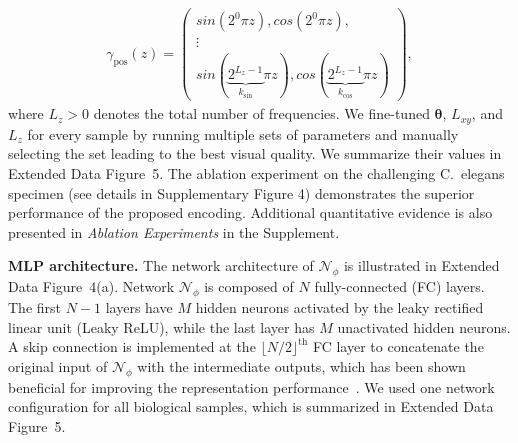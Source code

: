\documentclass[11pt]{article}
\theoremstyle{plain} %
\def\Ncal{{\mathcal{N}}}
\def\sin{{\textit{sin}}}
\def\cos{{\textit{cos}}}
\begin{document}
\begin{align}
\label{Eq:Pos}
\gamma_\text{pos}(z) = 
        \begin{pmatrix}
           \sin\left(2^0\pi z\right),\cos\left(2^0\pi z\right), \\
           \vdots \\
           \sin(\underbrace{2^{L_z-1}}_{k_\text{sin}}\pi z),\cos(\underbrace{2^{L_z-1}}_{k_\text{cos}}\pi z)
         \end{pmatrix},
\end{align}
where $L_z>0$ denotes the total number of frequencies.
We fine-tuned $\bm{\theta}$, $L_{xy}$, and $L_{z}$ for every sample by running multiple sets of parameters and manually selecting the set leading to the best visual quality. 
We summarize their values in Extended Data Figure~5.
The ablation experiment on the challenging C.\ elegans specimen (see details in Supplementary Figure 4) demonstrates the superior performance of the proposed encoding. Additional quantitative evidence is also presented in \emph{Ablation Experiments} in the Supplement.

\vspace{0.5em}
\noindent
\textbf{MLP architecture.}
The network architecture of $\Ncal_\phi$ is illustrated in Extended Data Figure~4(a).
Network $\Ncal_\phi$ is composed of $N$ fully-connected (FC) layers.
The first $N-1$ layers have $M$ hidden neurons activated by the leaky rectified linear unit (Leaky ReLU), while the last layer has $M$ unactivated hidden neurons.
A skip connection is implemented at the $\lfloor N/2 \rfloor^\text{th}$ FC layer to concatenate the original input of $\Ncal_\phi$ with the intermediate outputs, which has been shown beneficial for improving the representation performance~\cite{Park.etal2019}.
We used one network configuration for all biological samples, which is summarized in Extended Data Figure~5.
\end{document}
